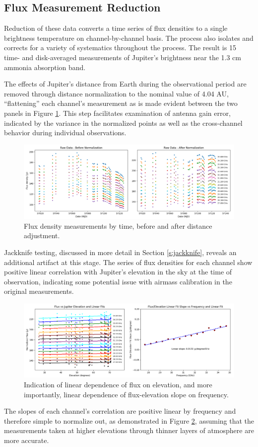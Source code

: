 \documentclass{article}
\begin{document}
\subsection{Flux Measurement Reduction} \label{}
	Reduction of these data converts a time series of flux densities to a single brightness temperature on channel-by-channel basis.
	The process also isolates and corrects for a variety of systematics throughout the process.
	The result is 15 time- and disk-averaged measurements of Jupiter's brightness near the 1.3 cm ammonia absorption band.

	The effects of Jupiter's distance from Earth during the observational period are removed through distance normalization to the nominal value of 4.04 AU, ``flattening'' each channel's measurement as is made evident between the two panels in Figure \ref{fig:raw}.
	This step facilitates examination of antenna gain error, indicated by the variance in the normalized points as well as the cross-channel behavior during individual observations.
	\begin{figure}
		\centering
		\includegraphics[width=\textwidth]{final_raw.png}
		\caption{\label{fig:raw}Flux density measurements by time, before and after distance adjustment.}
	\end{figure}
	Jackknife testing, discussed in more detail in Section \ref{s:jackknife}, reveals an additional artifact at this stage.
	The series of flux densities for each channel show positive linear correlation with Jupiter's elevation in the sky at the time of observation, indicating some potential issue with airmass calibration in the original measurements.
	\begin{figure}
		\centering
		\includegraphics[width=\textwidth]{final_airmass.png}
		\caption{\label{fig:air}Indication of linear dependence of flux on elevation, and more importantly, linear dependence of flux-elevation slope on frequency.}
	\end{figure}
	The slopes of each channel's correlation are positive linear by frequency and therefore simple to normalize out, as demonstrated in Figure \ref{fig:air}, assuming that the measurements taken at higher elevations through thinner layers of atmosphere are more accurate.
\end{document}
